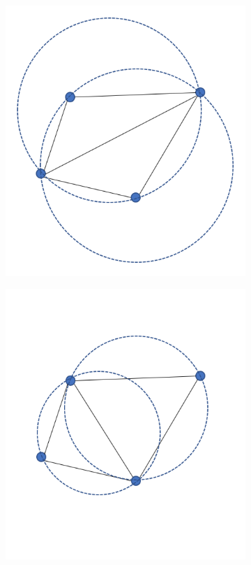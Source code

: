 \documentclass{article}
\begin{document}
\begin{figure}[h!] \label{fig:Delaunayflip}
  \centering
  \begin{subfigure}[b]{0.4\linewidth}
    \includegraphics[width=\linewidth]{Fig_Delaunayflip_01.png}
    \caption{}
  \end{subfigure}
  \begin{subfigure}[b]{0.4\linewidth}
    \includegraphics[width=\linewidth]{Fig_Delaunayflip_02.png}

\end{subfigure}
\end{figure}
\end{document}
